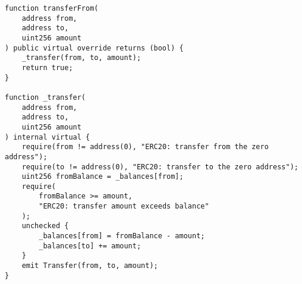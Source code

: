 \begin{lstlisting}[label={lst:erc20-high},captionpos=b, caption={ERC20 Contract 0x294d7be2: high violation severity found by AuditGPT},language=solidity]
function transferFrom(
    address from,
    address to,
    uint256 amount
) public virtual override returns (bool) {
    _transfer(from, to, amount);
    return true;
}

function _transfer(
    address from,
    address to,
    uint256 amount
) internal virtual {
    require(from != address(0), "ERC20: transfer from the zero address");
    require(to != address(0), "ERC20: transfer to the zero address");
    uint256 fromBalance = _balances[from];
    require(
        fromBalance >= amount,
        "ERC20: transfer amount exceeds balance"
    );
    unchecked {
        _balances[from] = fromBalance - amount;
        _balances[to] += amount;
    }
    emit Transfer(from, to, amount);
}
\end{lstlisting}
